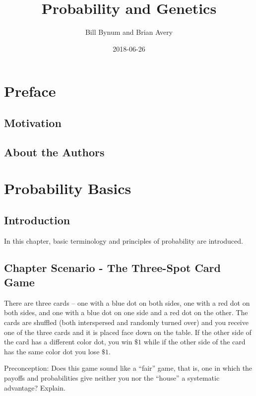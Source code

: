 \documentclass[]{book}
\title{Probability and Genetics}
\author{Bill Bynum and Brian Avery}
\date{2018-06-26}
\theoremstyle{definition}
\theoremstyle{definition}
\theoremstyle{definition}
\theoremstyle{remark}
\begin{document}
\maketitle

{
\setcounter{tocdepth}{1}
\tableofcontents
}
\chapter*{Preface}\label{preface}

\section{Motivation}\label{motivation}

\section{About the Authors}\label{about-the-authors}

\chapter{Probability Basics}\label{basics}

\section{Introduction}\label{introduction}

In this chapter, basic terminology and principles of probability are
introduced.

\section{Chapter Scenario - The Three-Spot Card
Game}\label{chapter_scenario}

There are three cards -- one with a blue dot on both sides, one with a
red dot on both sides, and one with a blue dot on one side and a red dot
on the other. The cards are shuffled (both interspersed and randomly
turned over) and you receive one of the three cards and it is placed
face down on the table. If the other side of the card has a different
color dot, you win \(\$1\) while if the other side of the card has the
same color dot you lose \(\$1\).

Preconception: Does this game sound like a ``fair'' game, that is, one
in which the payoffs and probabilities give neither you nor the
``house'' a systematic advantage? Explain.
\end{document}
